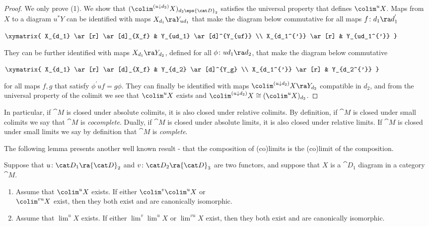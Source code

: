 \begin{proof}
We only prove (1). We show that $({\colim}^{(u \downarrow d_2)} X)_{d_2 \eps {\cat D}_2}$ satisfies the universal property that defines $\colim^u X$. Maps from $X$ to a diagram $u^* Y$ can be identified with maps $X_{d_1} \ra Y_{ud_1}$ that make the diagram below commutative for all maps $f \colon d_1 \ra d_1^{'}$
\begin{center}
$\xymatrix{
    X_{d_1} \ar[r] \ar[d]_{X_f} &  Y_{ud_1} \ar[d]^{Y_{uf}} \\
    X_{d_1^{'}} \ar[r] & Y_{ud_1^{'}}
    }$
\end{center}
They can be further identified with maps $X_{d_1} \ra Y_{d_2}$, defined for all $\phi \colon ud_1 \ra d_2$, that make the diagram below commutative 
\begin{center}
$\xymatrix{
    X_{d_1} \ar[r] \ar[d]_{X_f} &  Y_{d_2} \ar[d]^{Y_g} \\
    X_{d_1^{'}} \ar[r] & Y_{d_2^{'}}
    }$
\end{center}
for all maps $f, g$ that satisfy $\phi^{'} uf = g \phi$. They can  finally be identified with maps ${\colim}^{(u \downarrow d_2)} X \ra Y_{d_2}$ compatible in $d_2$, and from the universal property of the colimit we see that ${\colim}^u X$ exists and ${\colim}^{(u \downarrow d_2)} X \cong ({\colim}^u X)_{d_2}$.
\end{proof}

In particular, if ${\cat M}$ is closed under absolute colimits, it is also closed under relative colimits. By definition, if ${\cat M}$ is closed under small colimits we say that ${\cat M}$ is {\it cocomplete}. Dually, if ${\cat M}$ is closed under absolute limits, it is also closed under relative limits. If ${\cat M}$ is closed under small limits we say by definition that ${\cat M}$ is {\it complete}.

The following lemma presents another well known result - that the composition of (co)limits is the (co)limit of the composition.


\begin{lem}
\label{lem::colimcomposition}
Suppose that $u \colon {\cat D}_1 \ra {\cat D}_2$ and $v \colon {\cat D}_2 \ra {\cat D}_3$ are two functors, and suppose that $X$ is a ${\cat D}_1$ diagram in a category ${\cat M}$.
\begin{enumerate}
\item
Assume that $\colim^u X$ exists. If either $\colim^v \colim^u X$ or \\ $\colim^{vu} X$ exist, then they both exist and are canonically isomorphic.
\item
Assume that $\lim^u X$ exists. If either $\lim^v \lim^u X$ or $\lim^{vu} X$ exist, then they both exist and are canonically isomorphic.
\end{enumerate}
\end{lem}

